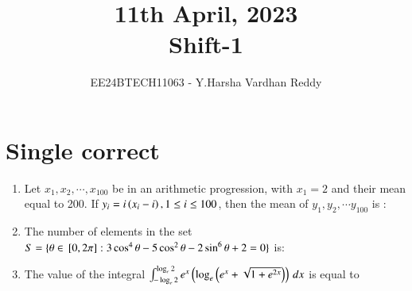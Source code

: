 \documentclass[journal,,12pt,onecolumn]{IEEEtran}
\theoremstyle{remark}
\begin{document}

\vspace{3cm}

\title{11th April, 2023\\Shift-1}
\author{EE24BTECH11063 - Y.Harsha Vardhan Reddy}
\maketitle

\bigskip

\renewcommand{\thefigure}{\theenumi}
\renewcommand{\thetable}{\theenumi}

\section*{Single correct}
\begin{enumerate}
    \item Let $x_1,x_2,\cdots ,x_{100}$ be in an arithmetic progression, with $x_1=2$ and their mean equal to 200. If $y_i=i\left(x_i-i\right),1 \le i \le 100$, then the mean of $y_1,y_2,\cdots y_{100}$ is :
    \begin{enumerate}
        \end{enumerate}
        \bigskip
        \item The number of elements in the set $S=\{\theta \in {}\left[0,2\pi\right]:3\cos^{4}{\theta}-5\cos^{2}{\theta}-2\sin^{6}{\theta}+2=0\}$ is:
        \begin{enumerate}
        \end{enumerate}
        \bigskip
\item The value of the integral $\int_{-\log_{e}{2}}^{\log_{e}{2}} e^x\left(\log_{e}{\left(e^x+\sqrt{1+e^{2x}}\right)}\right)  \, dx$ is equal to
        \begin{enumerate}
        \begin{multicols}{2}

\end{multicols}
\end{enumerate}
\end{enumerate}
\end{document}

